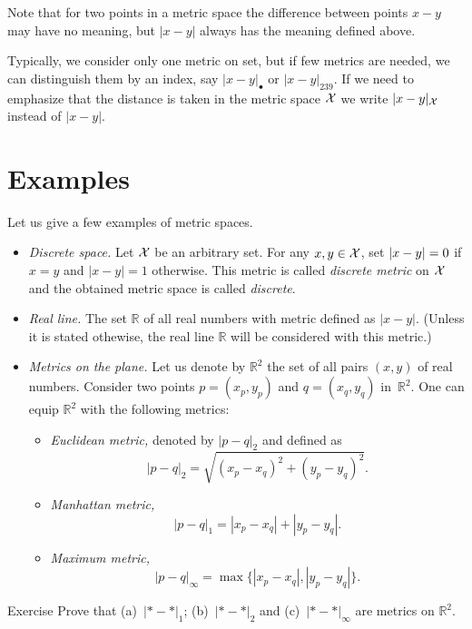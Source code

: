 Note that for two points in a metric space  the difference between points $x-y$ may have no meaning,
but $|x-y|$ always has the meaning defined above.

Typically, we consider only one metric on set, 
but if few metrics are needed, we can distinguish them by an index, say  $|x-y|_{\bullet}$ or $|x-y|_{239}$.
If we need to emphasize that the distance is taken in the metric space $\mathcal{X}$ we write $|x-y|_{\mathcal X}$ instead of $|x-y|$.

\section{Examples}\label{sec:examples(metric-spaces)}

Let us give a few examples of metric spaces.

\begin{itemize}
\item\emph{Discrete space.}\label{page:Discrete metric} Let $\mathcal X$ be an arbitrary set. 
For any $x,y\z\in\c X$, 
set $|x-y|\z=0$ if $x=y$ and $|x-y|=1$ otherwise.
This metric is called \emph{discrete metric} on $\mathcal X$ and the obtained metric space is called \emph{discrete}.
\item{}\emph{Real line.} 
The set $\mathbb{R}$ of all real numbers with metric defined as 
$|x-y|$. 
(Unless it is stated othewise, the real line $\mathbb{R}$ will be considered with this metric.) 
\item {}\emph{Metrics on the plane.}\label{page:Metrics on the plane}
Let us denote by $\mathbb{R}^2$ the set of all pairs $(x,y)$ of real numbers.
Consider two points $p=(x_p,y_p)$ and $q=(x_q,y_q)$  in~$\mathbb{R}^2$.
One can equip $\mathbb{R}^2$ with the following metrics:
\begin{itemize}
\item{}\emph{Euclidean metric,} denoted by $|p-q|_2$  and defined as
$$|p-q|_2=\sqrt{(x_p-x_q)^2+(y_p-y_q)^2}.$$
\item\label{Manhattan plane}\emph{Manhattan metric,}  
$$|p-q|_1=|x_p-x_q|+|y_p-y_q|.$$
\item{}\emph{Maximum metric,} 
$$|p-q|_\infty=\max\{|x_p-x_q|,|y_p-y_q|\}.$$
\end{itemize}
\end{itemize}

\begin{thm}{Exercise}\label{ex:d1+d2+dinfty}
Prove that (a)~$|{*}-{*}|_1$; (b)~$|{*}-{*}|_2$ and (c)~$|{*}-{*}|_\infty$ are metrics on $\mathbb{R}^2$.
\end{thm}

